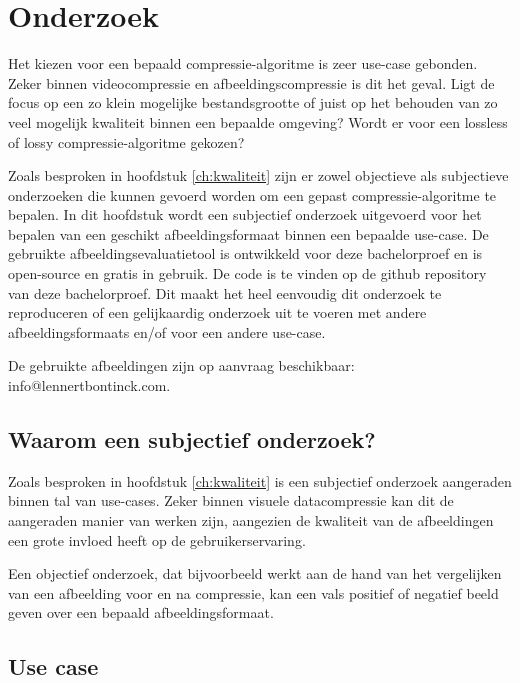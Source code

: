 \chapter{Onderzoek}
\label{ch:onderzoek}

Het kiezen voor een bepaald \gls{compressie-algoritme} is zeer \gls{use-case} gebonden. Zeker binnen \gls{videocompressie} en \gls{afbeeldingscompressie} is dit het geval. Ligt de focus op een zo klein mogelijke bestandsgrootte of juist op het behouden van zo veel mogelijk kwaliteit binnen een bepaalde omgeving? Wordt er voor een \gls{lossless} of \gls{lossy} \gls{compressie-algoritme} gekozen?

Zoals besproken in hoofdstuk \ref{ch:kwaliteit} zijn er zowel objectieve als subjectieve onderzoeken die kunnen gevoerd worden om een gepast \gls{compressie-algoritme} te bepalen. In dit hoofdstuk wordt een subjectief onderzoek uitgevoerd voor het bepalen van een geschikt \gls{afbeeldingsformaat} binnen een bepaalde \gls{use-case}. De gebruikte \gls{afbeeldingsevaluatietool} is ontwikkeld voor deze bachelorproef en is \gls{open-source} en gratis in gebruik. De code is te vinden op de \gls{github} repository van deze bachelorproef. Dit maakt het heel eenvoudig dit onderzoek te reproduceren of een gelijkaardig onderzoek uit te voeren met andere \glspl{afbeeldingsformaat} en/of voor een andere \gls{use-case}.

De gebruikte afbeeldingen zijn op aanvraag beschikbaar: info@lennertbontinck.com.

\section{Waarom een subjectief onderzoek?}
\label{sec:onderzoek-waarom-subjectief}

Zoals besproken in hoofdstuk \ref{ch:kwaliteit} is een subjectief onderzoek aangeraden binnen tal van \glspl{use-case}. Zeker binnen visuele \gls{datacompressie} kan dit de aangeraden manier van werken zijn, aangezien de kwaliteit van de afbeeldingen een grote invloed heeft op de gebruikerservaring. 

Een objectief onderzoek, dat bijvoorbeeld werkt aan de hand van het vergelijken van een afbeelding voor en na compressie, kan een vals positief of negatief beeld geven over een bepaald \gls{afbeeldingsformaat}.

\section{Use case}
\label{sec:onderzoek-use-case}

